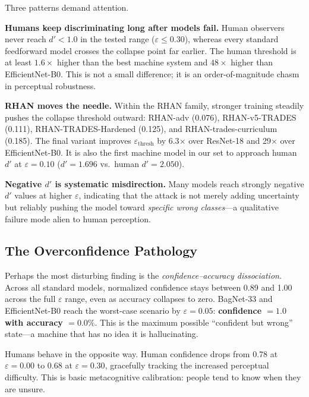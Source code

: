 \documentclass[12pt,a4paper]{article}
\begin{document}
Three patterns demand attention.

\textbf{Humans keep discriminating long after models fail.} Human observers
never reach $d'{<}1.0$ in the tested range ($\varepsilon \le 0.30$), whereas
every standard feedforward model crosses the collapse point far earlier. The
human threshold is at least $1.6\times$ higher than the best machine system
and $48\times$ higher than EfficientNet-B0. This is not a small difference;
it is an order-of-magnitude chasm in perceptual robustness.

\textbf{RHAN moves the needle.} Within the RHAN family, stronger training
steadily pushes the collapse threshold outward: RHAN-adv (0.076), RHAN-v5-TRADES
(0.111), RHAN-TRADES-Hardened (0.125), and RHAN-trades-curriculum (0.185).
The final variant improves $\varepsilon_{\text{thresh}}$ by 6.3$\times$ over
ResNet-18 and 29$\times$ over EfficientNet-B0. It is also the first machine
model in our set to approach human $d'$ at $\varepsilon{=}0.10$
($d'{=}1.696$ vs.\ human $d'{=}2.050$).

\textbf{Negative $d'$ is systematic misdirection.} Many models reach strongly
negative $d'$ values at higher $\varepsilon$, indicating that the attack is
not merely adding uncertainty but reliably pushing the model toward
\textit{specific wrong classes}---a qualitative failure mode alien to human
perception.

\subsection{The Overconfidence Pathology}
\label{sec:overconfidence}

Perhaps the most disturbing finding is the \textit{confidence--accuracy
dissociation}. Across all standard models, normalized confidence stays
between 0.89 and 1.00 across the full $\varepsilon$ range, even as
accuracy collapses to zero. BagNet-33 and EfficientNet-B0 reach the
worst-case scenario by $\varepsilon{=}0.05$: \textbf{confidence $= 1.0$
with accuracy $= 0.0\%$}. This is the maximum possible ``confident but
wrong'' state---a machine that has no idea it is hallucinating.

Humans behave in the opposite way. Human confidence drops from 0.78 at
$\varepsilon{=}0.00$ to 0.68 at $\varepsilon{=}0.30$, gracefully tracking
the increased perceptual difficulty. This is basic metacognitive
calibration: people tend to know when they are unsure.
\end{document}
